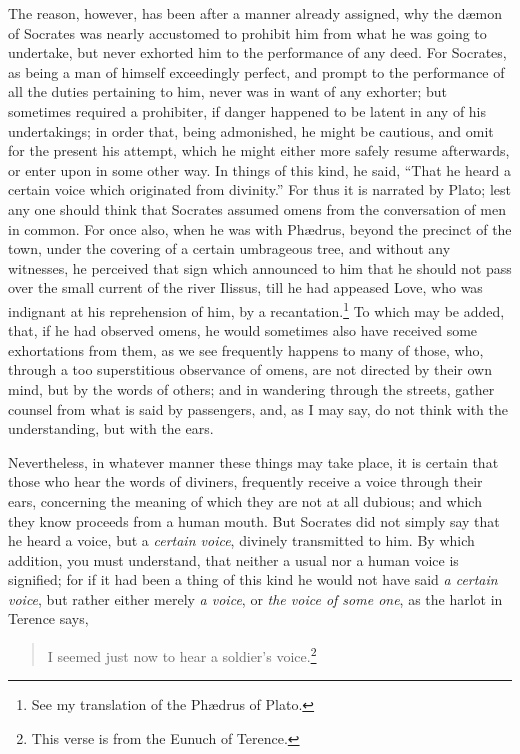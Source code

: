 \documentclass[12pt]{article}
\begin{document}
The reason, however, has been after a manner already assigned, why the
d{\ae}mon of Socrates was nearly accustomed to prohibit him from what he was
going to undertake, but never exhorted him to the performance of any deed. For
Socrates, as being a man of himself exceedingly perfect, and prompt to the
performance of all the duties pertaining to him, never was in want of any
exhorter; but sometimes required a prohibiter, if danger happened to be latent
in any of his undertakings; in order that, being admonished, he might be
cautious, and omit for the present his attempt, which he might either more
safely resume afterwards, or enter upon in some other way. In things of this
kind, he said, ``That he heard a certain voice which originated from
divinity.'' For thus it is narrated by Plato; lest any one should think that
Socrates assumed omens from the conversation of men in common. For once also,
when he was with Ph{\ae}drus, beyond the precinct of the town, under the
covering of a certain umbrageous tree, and without any witnesses, he perceived
that sign which announced to him that he should not pass over the small current
of the river Ilissus, till he had appeased Love, who was indignant at his
reprehension of him, by a recantation.\footnote{See my translation of the
Ph{\ae}drus of Plato.} To which may be added, that, if he had observed
omens, he would sometimes also have received some exhortations from them, as we
see frequently happens to many of those, who, through a too superstitious
observance of omens, are not directed by their own mind, but by the words of
others; and in wandering through the streets, gather counsel from what is said
by passengers, and, as I may say, do not think with the understanding, but with
the ears.

Nevertheless, in whatever manner these things may take place, it is certain
that those who hear the words of diviners, frequently receive a voice through
their ears, concerning the meaning of which they are not at all dubious; and
which they know proceeds from a human mouth. But Socrates did not simply say
that he heard a voice, but a \textit{certain voice}, divinely transmitted to
him.  By which addition, you must understand, that neither a usual nor a human
voice is signified; for if it had been a thing of this kind he would not have
said \textit{a certain voice}, but rather either merely \textit{a voice}, or
\textit{the voice of some one}, as the harlot in Terence says,

\begin{verse}
I seemed just now to hear a soldier's voice.\footnote{This verse is from the
Eunuch of Terence.}
\end{verse}
\end{document}
